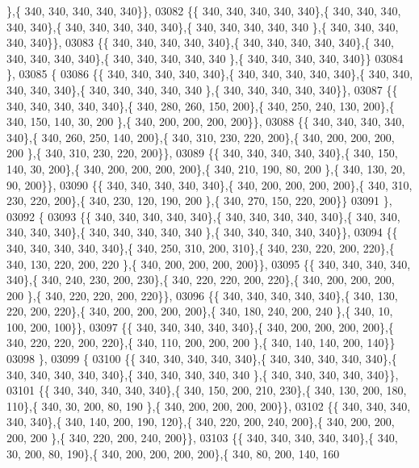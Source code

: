 \begin{DoxyCode}
      \},\{ 340, 340, 340, 340, 340\}\},
03082 \{\{ 340, 340, 340, 340, 340\},\{ 340, 340, 340, 340, 340\},\{ 340, 340, 340, 340, 340\},\{ 340, 340, 340, 340, 340
      \},\{ 340, 340, 340, 340, 340\}\},
03083 \{\{ 340, 340, 340, 340, 340\},\{ 340, 340, 340, 340, 340\},\{ 340, 340, 340, 340, 340\},\{ 340, 340, 340, 340, 340
      \},\{ 340, 340, 340, 340, 340\}\}
03084 \},
03085 \{
03086 \{\{ 340, 340, 340, 340, 340\},\{ 340, 340, 340, 340, 340\},\{ 340, 340, 340, 340, 340\},\{ 340, 340, 340, 340, 340
      \},\{ 340, 340, 340, 340, 340\}\},
03087 \{\{ 340, 340, 340, 340, 340\},\{ 340, 280, 260, 150, 200\},\{ 340, 250, 240, 130, 200\},\{ 340, 150, 140,  30, 200
      \},\{ 340, 200, 200, 200, 200\}\},
03088 \{\{ 340, 340, 340, 340, 340\},\{ 340, 260, 250, 140, 200\},\{ 340, 310, 230, 220, 200\},\{ 340, 200, 200, 200, 200
      \},\{ 340, 310, 230, 220, 200\}\},
03089 \{\{ 340, 340, 340, 340, 340\},\{ 340, 150, 140,  30, 200\},\{ 340, 200, 200, 200, 200\},\{ 340, 210, 190,  80, 200
      \},\{ 340, 130,  20,  90, 200\}\},
03090 \{\{ 340, 340, 340, 340, 340\},\{ 340, 200, 200, 200, 200\},\{ 340, 310, 230, 220, 200\},\{ 340, 230, 120, 190, 200
      \},\{ 340, 270, 150, 220, 200\}\}
03091 \},
03092 \{
03093 \{\{ 340, 340, 340, 340, 340\},\{ 340, 340, 340, 340, 340\},\{ 340, 340, 340, 340, 340\},\{ 340, 340, 340, 340, 340
      \},\{ 340, 340, 340, 340, 340\}\},
03094 \{\{ 340, 340, 340, 340, 340\},\{ 340, 250, 310, 200, 310\},\{ 340, 230, 220, 200, 220\},\{ 340, 130, 220, 200, 220
      \},\{ 340, 200, 200, 200, 200\}\},
03095 \{\{ 340, 340, 340, 340, 340\},\{ 340, 240, 230, 200, 230\},\{ 340, 220, 220, 200, 220\},\{ 340, 200, 200, 200, 200
      \},\{ 340, 220, 220, 200, 220\}\},
03096 \{\{ 340, 340, 340, 340, 340\},\{ 340, 130, 220, 200, 220\},\{ 340, 200, 200, 200, 200\},\{ 340, 180, 240, 200, 240
      \},\{ 340,  10, 100, 200, 100\}\},
03097 \{\{ 340, 340, 340, 340, 340\},\{ 340, 200, 200, 200, 200\},\{ 340, 220, 220, 200, 220\},\{ 340, 110, 200, 200, 200
      \},\{ 340, 140, 140, 200, 140\}\}
03098 \},
03099 \{
03100 \{\{ 340, 340, 340, 340, 340\},\{ 340, 340, 340, 340, 340\},\{ 340, 340, 340, 340, 340\},\{ 340, 340, 340, 340, 340
      \},\{ 340, 340, 340, 340, 340\}\},
03101 \{\{ 340, 340, 340, 340, 340\},\{ 340, 150, 200, 210, 230\},\{ 340, 130, 200, 180, 110\},\{ 340,  30, 200,  80, 190
      \},\{ 340, 200, 200, 200, 200\}\},
03102 \{\{ 340, 340, 340, 340, 340\},\{ 340, 140, 200, 190, 120\},\{ 340, 220, 200, 240, 200\},\{ 340, 200, 200, 200, 200
      \},\{ 340, 220, 200, 240, 200\}\},
03103 \{\{ 340, 340, 340, 340, 340\},\{ 340,  30, 200,  80, 190\},\{ 340, 200, 200, 200, 200\},\{ 340,  80, 200, 140, 160

\end{DoxyCode}

